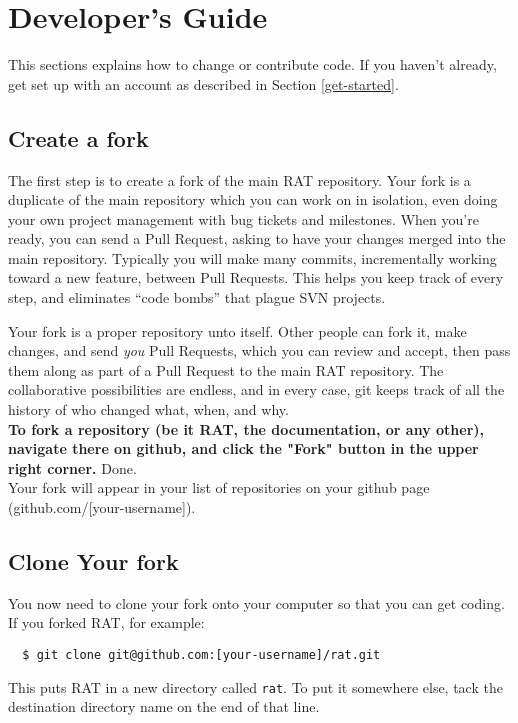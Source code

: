 \documentclass{article}
\begin{document}
\section{Developer's Guide}
\label{devguide}
This sections explains how to change or contribute code. If you haven't already, get set up with an account as described in Section \ref{get-started}.
\subsection{Create a fork}
\label{create-fork}
The first step is to create a fork of the main RAT repository. Your fork is a duplicate of the main repository which you can work on in isolation, even doing your own project management with bug tickets and milestones. When you're ready, you can send a Pull Request, asking to have your changes merged into the main repository. Typically you will make many commits, incrementally working toward a new feature, between Pull Requests. This helps you keep track of every step, and eliminates ``code bombs'' that plague SVN projects.

Your fork is a proper repository unto itself. Other people can fork it, make changes, and send {\it you} Pull Requests, which you can review and accept, then pass them along as part of a Pull Request to the main RAT repository. The collaborative possibilities are endless, and in every case, git keeps track of all the history of who changed what, when, and why.\\

{\bf To fork a repository (be it RAT, the documentation, or any other), navigate there on github, and click the "Fork" button in the upper right corner.} Done.\\

Your fork will appear in your list of repositories on your github page (github.com/[your-username]).

\subsection{Clone Your fork}
\label{clone-fork}
You now need to clone your fork onto your computer so that you can get coding. If you forked RAT, for example:
\begin{verbatim}
  $ git clone git@github.com:[your-username]/rat.git
\end{verbatim}
This puts RAT in a new directory called {\tt rat}. To put it somewhere else, tack the destination directory name on the end of that line.\\
\end{document}
